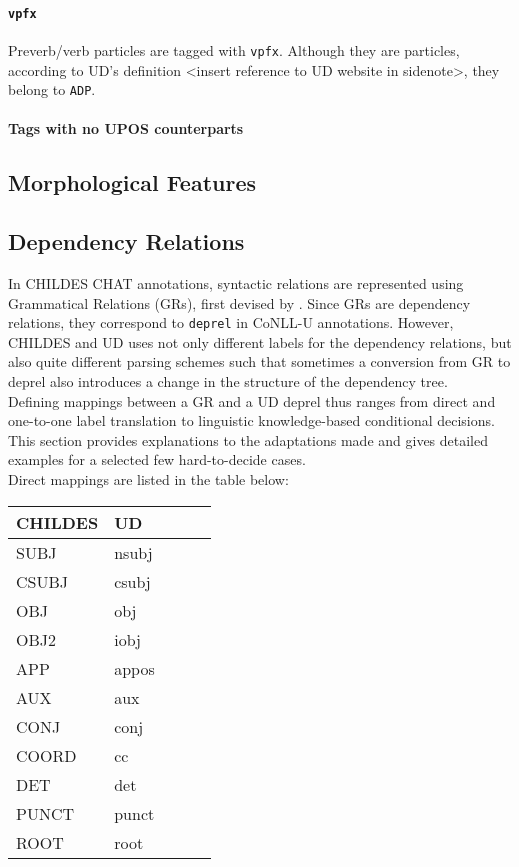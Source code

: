 \paragraph{\texttt{vpfx}}
Preverb/verb particles are tagged with \texttt{vpfx}. Although they are particles, according to UD's definition <insert reference to UD website in sidenote>, they belong to \texttt{ADP}.\\

\paragraph{Tags with no UPOS counterparts}

\subsection{Morphological Features}


\subsection{Dependency Relations}

In CHILDES CHAT annotations, syntactic relations are represented using Grammatical Relations (GRs), first devised by \cite{Sagae2004}. Since GRs are dependency relations, they correspond to \texttt{deprel} in CoNLL-U annotations. However, CHILDES and UD uses not only different labels for the dependency relations, but also quite different parsing schemes such that sometimes a conversion from GR to deprel also introduces a change in the structure of the dependency tree.\\

Defining mappings between a GR and a UD deprel thus ranges from direct and one-to-one label translation to linguistic knowledge-based conditional decisions. This section provides explanations to the adaptations made and gives detailed examples for a selected few hard-to-decide cases.\\

Direct mappings are listed in the table below:
\begin{table}[h!]
\begin{tabular}{@{}lllll@{}}
\toprule
\textbf{CHILDES} & \textbf{UD} & \\ \midrule
SUBJ & nsubj & \\
CSUBJ & csubj & \\
OBJ & obj & \\
OBJ2 & iobj & \\
APP & appos & \\
AUX & aux & \\
CONJ & conj & \\
COORD & cc & \\
DET & det & \\
PUNCT & punct & \\
ROOT & root & \\\bottomrule
\end{tabular}
\end{table}



